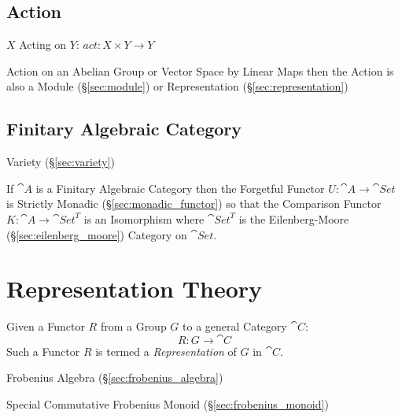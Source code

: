 \subsection{Action}\label{sec:action}


$X$ Acting on $Y$: $act: X \times Y \rightarrow Y$

Action on an Abelian Group or Vector Space by Linear Maps then the
Action is also a Module (\S\ref{sec:module}) or Representation
(\S\ref{sec:representation})



\subsection{Finitary Algebraic Category}
\label{sec:finitary_algebraic_category}

Variety (\S\ref{sec:variety})

If $\cat{A}$ is a Finitary Algebraic Category then the Forgetful
Functor $U : \cat{A} \rightarrow \cat{Set}$ is Strictly Monadic
(\S\ref{sec:monadic_functor}) so that the Comparison Functor $K :
\cat{A} \rightarrow \cat{Set}^T$ is an Isomorphism where
$\cat{Set}^T$ is the Eilenberg-Moore (\S\ref{sec:eilenberg_moore})
Category on $\cat{Set}$.




\section{Representation Theory}\label{sec:representation_theory}

Given a Functor $R$ from a Group $G$ to a general Category
$\cat{C}$:
\[
    R : G \rightarrow \cat{C}
\]
Such a Functor $R$ is termed a \emph{Representation} of $G$ in
$\cat{C}$.

Frobenius Algebra (\S\ref{sec:frobenius_algebra})

Special Commutative Frobenius Monoid (\S\ref{sec:frobenius_monoid})




